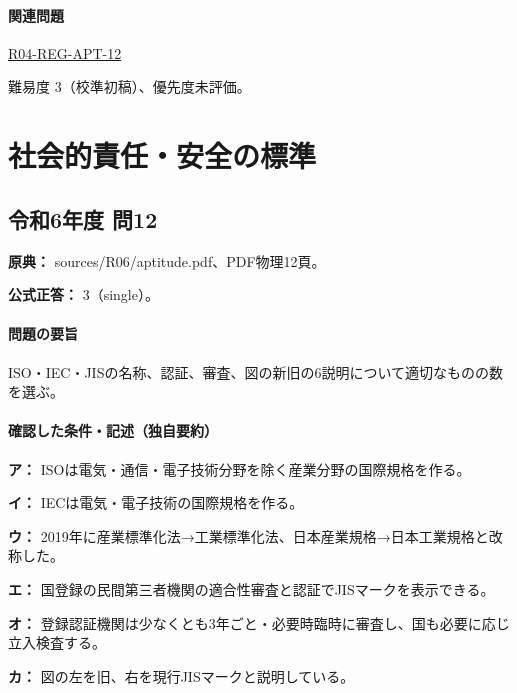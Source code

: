 \paragraph{関連問題} \hyperref[q:r04-reg-apt-12]{R04-REG-APT-12}

\par 難易度 3（校準初稿）、優先度未評価。

\section{社会的責任・安全の標準}

\subsection{令和6年度 問12}
\label{q:r06-reg-apt-12}

\noindent\textbf{原典：} sources/R06/aptitude.pdf、PDF物理12頁。

\textbf{公式正答：} 3（single）。

\paragraph{問題の要旨} ISO・IEC・JISの名称、認証、審査、図の新旧の6説明について適切なものの数を選ぶ。

\paragraph{確認した条件・記述（独自要約）}\mbox{}\par

\noindent\textbf{ア：} ISOは電気・通信・電子技術分野を除く産業分野の国際規格を作る。\par

\noindent\textbf{イ：} IECは電気・電子技術の国際規格を作る。\par

\noindent\textbf{ウ：} 2019年に産業標準化法→工業標準化法、日本産業規格→日本工業規格と改称した。\par

\noindent\textbf{エ：} 国登録の民間第三者機関の適合性審査と認証でJISマークを表示できる。\par

\noindent\textbf{オ：} 登録認証機関は少なくとも3年ごと・必要時臨時に審査し、国も必要に応じ立入検査する。\par

\noindent\textbf{カ：} 図の左を旧、右を現行JISマークと説明している。\par

